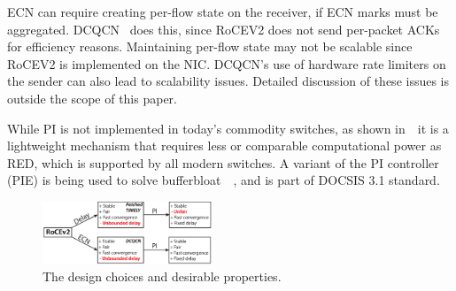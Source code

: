 ECN can require creating per-flow state on the receiver, if ECN marks must be
aggregated. DCQCN~\cite{dcqcn} does this, since RoCEV2 does not send per-packet
ACKs for efficiency reasons. Maintaining per-flow state may not be scalable since
RoCEV2 is implemented on the NIC.  DCQCN's use of hardware rate limiters on the
sender can also lead to scalability issues.  Detailed discussion of these issues
is outside the scope of this paper.

While PI is not implemented in today's commodity switches, as shown
in~\cite{hollot2001designing}~it is a lightweight mechanism that requires less
or comparable computational power as RED, which is supported by all modern
switches. A variant of the PI controller (PIE) is being used to solve
bufferbloat~\cite{conf/hpsr/PanNPPSBV13,bufferbloat-pi}~, and is part of DOCSIS 3.1
standard.

\begin{figure}[t]
 \center
\includegraphics[width=0.45\textwidth]{figures/design_choice.eps}
\vspace{-0.5em}
 \caption{The design choices and desirable properties.}
\vspace{-1.5em}
\label{fig:design_choice}
\end{figure}


